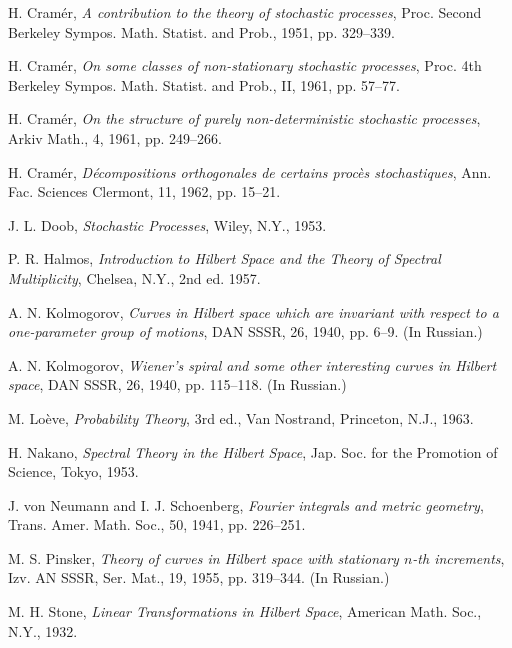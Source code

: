 \documentclass[11pt]{article}
\begin{document}
\begin{thebibliography}{99}
 H. Cram\'er, \emph{A contribution to the theory of stochastic processes}, Proc. Second Berkeley Sympos. Math. Statist. and Prob., 1951, pp. 329--339.

 H. Cram\'er, \emph{On some classes of non-stationary stochastic processes}, Proc. 4th Berkeley Sympos. Math. Statist. and Prob., II, 1961, pp. 57--77.

 H. Cram\'er, \emph{On the structure of purely non-deterministic stochastic processes}, Arkiv Math., 4, 1961, pp. 249--266.

 H. Cram\'er, \emph{D\'ecompositions orthogonales de certains proc\`es stochastiques}, Ann. Fac. Sciences Clermont, 11, 1962, pp. 15--21.

 J. L. Doob, \emph{Stochastic Processes}, Wiley, N.Y., 1953.

 P. R. Halmos, \emph{Introduction to Hilbert Space and the Theory of Spectral Multiplicity}, Chelsea, N.Y., 2nd ed. 1957.

 A. N. Kolmogorov, \emph{Curves in Hilbert space which are invariant with respect to a one-parameter group of motions}, DAN SSSR, 26, 1940, pp. 6--9. (In Russian.)

 A. N. Kolmogorov, \emph{Wiener's spiral and some other interesting curves in Hilbert space}, DAN SSSR, 26, 1940, pp. 115--118. (In Russian.)

 M. Lo\`eve, \emph{Probability Theory}, 3rd ed., Van Nostrand, Princeton, N.J., 1963.

 H. Nakano, \emph{Spectral Theory in the Hilbert Space}, Jap. Soc. for the Promotion of Science, Tokyo, 1953.

 J. von Neumann and I. J. Schoenberg, \emph{Fourier integrals and metric geometry}, Trans. Amer. Math. Soc., 50, 1941, pp. 226--251.

 M. S. Pinsker, \emph{Theory of curves in Hilbert space with stationary $n$-th increments}, Izv. AN SSSR, Ser. Mat., 19, 1955, pp. 319--344. (In Russian.)

 M. H. Stone, \emph{Linear Transformations in Hilbert Space}, American Math. Soc., N.Y., 1932.
\end{thebibliography}
\end{document}
